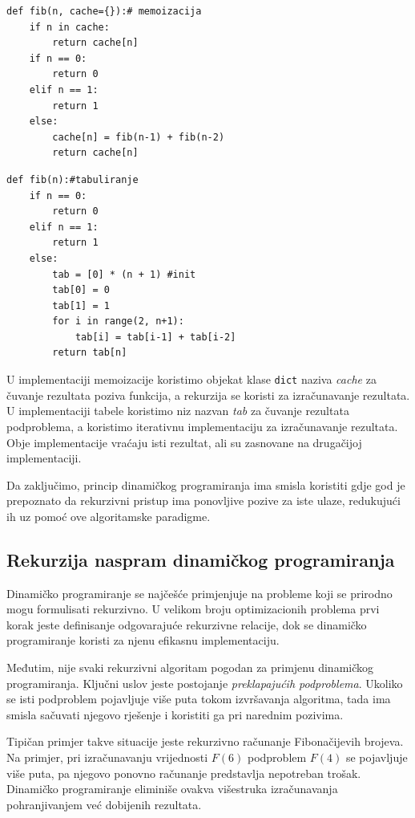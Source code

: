 \begin{verbatim}
def fib(n, cache={}):# memoizacija
	if n in cache:
		return cache[n]
	if n == 0:
		return 0
	elif n == 1:
		return 1
	else:
		cache[n] = fib(n-1) + fib(n-2)
		return cache[n]
\end{verbatim}

\begin{verbatim}  
def fib(n):#tabuliranje
	if n == 0:
		return 0
	elif n == 1:
		return 1
	else:
		tab = [0] * (n + 1) #init
		tab[0] = 0
		tab[1] = 1
		for i in range(2, n+1):
			tab[i] = tab[i-1] + tab[i-2]
		return tab[n]
\end{verbatim}
U implementaciji memoizacije koristimo objekat klase \texttt{dict} naziva \textit{cache} za čuvanje rezultata poziva funkcija, a rekurzija se koristi za izračunavanje rezultata. U implementaciji tabele koristimo niz nazvan \textit{tab} za čuvanje rezultata podproblema, a koristimo iterativnu impleme\-ntaciju za izračunava\-nje rezultata. Obje implementacije vraćaju isti rezultat, ali su zasnovane na drugačijoj implementaciji. %

Da zaključimo, princip dinamičkog programiranja ima smisla koristiti gdje god je prepoznato da rekurzivni pristup ima ponovljive pozive za iste ulaze, redukujući ih uz pomoć ove algoritamske paradigme.

\subsection{Rekurzija naspram dinamičkog programiranja}

Dinamičko programiranje se najčešće primjenjuje na probleme koji se prirodno mogu formulisati rekurzivno. U velikom broju optimizacionih problema prvi korak jeste definisanje odgovarajuće rekurzivne relacije, dok se dinamičko programiranje koristi za njenu efikasnu implementaciju.

Međutim, nije svaki rekurzivni algoritam pogodan za primjenu dinamičkog programiranja. Ključni uslov jeste postojanje \textit{preklapajućih podproblema}. Ukoliko se isti podproblem pojavljuje više puta tokom izvršavanja algoritma, tada ima smisla sačuvati njegovo rješenje i koristiti ga pri narednim pozivima.

Tipičan primjer takve situacije jeste rekurzivno računanje Fibonačijevih brojeva. Na primjer, pri izračunavanju vrijednosti $F(6)$ podproblem $F(4)$ se pojavljuje više puta, pa njegovo ponovno računanje predstavlja nepotreban trošak. Dinamičko programiranje eliminiše ovakva višestruka izračunavanja pohranjivanjem već dobijenih rezultata.

